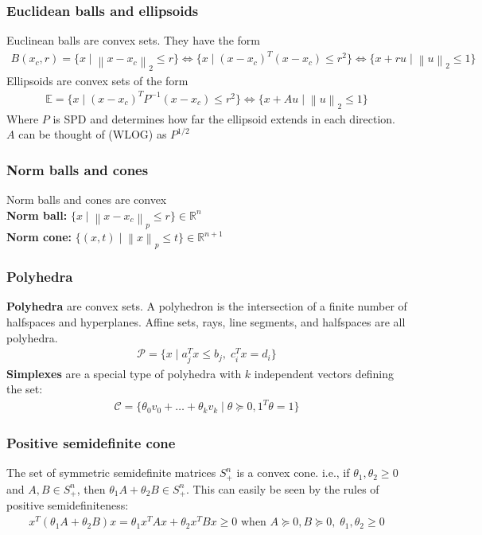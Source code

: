 \documentclass{article}
\newcommand{\norm}[2]{\left\lVert#1\right\rVert_#2}
\begin{document}
\subsubsection{Euclidean balls and ellipsoids}
Euclinean balls are convex sets. They have the form
\begin{align*}
  B(x_c, r) = \{x \mid \norm{x - x_c}{2} \leq r\} \Longleftrightarrow \{x \mid (x - x_c)^T(x - x_c) \leq r^2\} \Longleftrightarrow \{x + ru \mid \norm{u}{2} \leq 1\}
\end{align*}
Ellipsoids are convex sets of the form
\begin{align*}
  \mathbb{E} = \{x \mid (x - x_c)^TP^{-1}(x - x_c) \leq r^2\} \Longleftrightarrow \{x + Au \mid \norm{u}{2} \leq 1\}
\end{align*}
Where $P$ is SPD and determines how far the ellipsoid extends in each direction. $A$ can be thought of (WLOG) as $P^{1/2}$

\subsubsection{Norm balls and cones}
Norm balls and cones are convex\\
\textbf{Norm ball:} $\{ x \mid \norm{x - x_c}{p} \leq r \} \in \mathbb{R}^n$\\
\textbf{Norm cone:} $\{ (x,t) \mid \norm{x}{p} \leq t \} \in \mathbb{R}^{n+1}$\\

\subsubsection{Polyhedra}
\textbf{Polyhedra} are convex sets. A polyhedron is the intersection of a finite number of halfspaces and hyperplanes. Affine sets, rays, line segments, and halfspaces are all polyhedra.
\begin{align*}
  \mathcal{P} = \{ x \mid a_j^Tx \leq b_j, \; c_i^Tx = d_i \}
\end{align*}
\textbf{Simplexes} are a special type of polyhedra with $k$ independent vectors defining the set:
\begin{align*}
  \mathcal{C} = \{\theta_0v_0 + \dots + \theta_kv_k \mid \theta \succeq0, 1^T\theta = 1\}
\end{align*}


\subsubsection{Positive semidefinite cone}
The set of symmetric semidefinite matrices $S^n_+$ is a convex cone. i.e., if $\theta_1, \theta_2 \geq 0$ and $A,B\in S^n_+$, then $\theta_1A + \theta_2B \in S^n_+$. This can easily be seen by the rules of positive semidefiniteness:
\begin{align*}
  x^T(\theta_1A + \theta_2B)x = \theta_1x^TAx + \theta_2x^TBx \geq 0 \textrm{ when } A \succeq 0, B \succeq 0, \; \theta_1,\theta_2 \geq 0
\end{align*}
\end{document}
